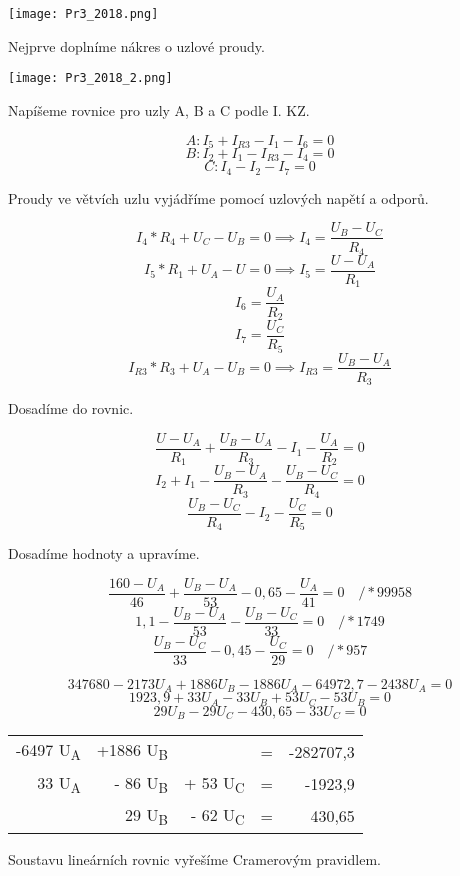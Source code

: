 \documentclass[11pt]{article}
\begin{document}
\begin{center}
	\texttt{[image: Pr3\_2018.png]} 
\end{center}

Nejprve doplníme nákres o uzlové proudy. 

\begin{center}
	\texttt{[image: Pr3\_2018\_2.png]} 
\end{center}

Napíšeme rovnice pro uzly A, B a C podle I. KZ.

\[A: I_5  + I_{R3} - I_1 - I_6 = 0\]
\[B: I_2  + I_1 - I_{R3} - I_4 = 0\]
\[C: I_4  - I_2 - I_7 = 0\]

Proudy ve větvích uzlu vyjádříme pomocí uzlových napětí a odporů. 

\[I_4 * R_4 + U_C - U_B = 0 \implies I_4 = \frac{U_B - U_C}{R_4}\]
\[I_5 * R_1 + U_A - U = 0 \implies I_5 = \frac{U - U_A}{R_1} \] 
\[I_6 = \frac{U_A}{R_2} \]
\[I_7 = \frac{U_C}{R_5}\]
\[I_{R3} * R_3 + U_A - U_B = 0 \implies I_{R3} = \frac{U_B - U_A}{R_3}\]

Dosadíme do rovnic.

\[\frac{U - U_A}{R_1} + \frac{U_B - U_A}{R_3} - I_1 - \frac{U_A}{R_2} = 0\]
\[I_2 + I_1 - \frac{U_B - U_A}{R_3} - \frac{U_B - U_C}{R_4} = 0\]
\[\frac{U_B - U_C}{R_4} - I_2 - \frac{U_C}{R_5} = 0\]

Dosadíme hodnoty a upravíme.

\[\frac{160 - U_A}{46} + \frac{U_B - U_A}{53} - 0,65 - \frac{U_A}{41} = 0 \quad / \ast 99958\]
\[1,1 - \frac{U_B - U_A}{53} - \frac{U_B - U_C}{33} = 0 \quad / \ast 1749\]
\[\frac{U_B - U_C}{33} - 0,45 - \frac{U_C}{29} = 0 \quad / \ast 957\]


\[347680 - 2173 U_A + 1886 U_B - 1886 U_A - 64972,7 - 2438 U_A = 0 \]
\[1923,9 + 33 U_A - 33 U_B + 53 U_C - 53 U_B = 0\]
\[29 U_B - 29 U_C - 430,65 - 33 U_C = 0\]

\begin{table}[]
	\begin{tabular}{r r r c r}
		-6497 U\textsubscript{A} & +1886 U\textsubscript{B} & & = & -282707,3 \\
		33 U\textsubscript{A}    & - 86 U\textsubscript{B}  & + 53 U\textsubscript{C} & = & -1923,9   \\
		& 29 U\textsubscript{B}    & - 62 U\textsubscript{C} & = & 430,65   
	\end{tabular}
\end{table}


Soustavu lineárních rovnic vyřešíme Cramerovým pravidlem.
\end{document}
